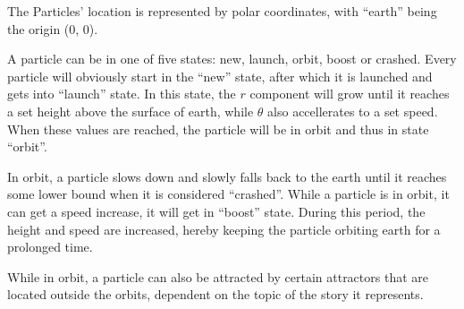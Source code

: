 The Particles' location is represented by polar coordinates, with ``earth''
being the origin (0, 0).

A particle can be in one of five states: new, launch, orbit, boost or crashed.
Every particle will obviously start in the ``new'' state, after which it is
launched and gets into ``launch'' state. In this state, the $r$ component will
grow until it reaches a set height above the surface of earth, while $\theta$
also accellerates to a set speed. When these values are reached, the particle
will be in orbit and thus in state ``orbit''.

In orbit, a particle slows down and slowly falls back to the earth until it
reaches some lower bound when it is considered ``crashed''. While a particle is
in orbit, it can get a speed increase, it will get in ``boost'' state. During
this period, the height and speed are increased, hereby keeping the particle
orbiting earth for a prolonged time.

While in orbit, a particle can also be attracted by certain attractors that are
located outside the orbits, dependent on the topic of the story it represents.

